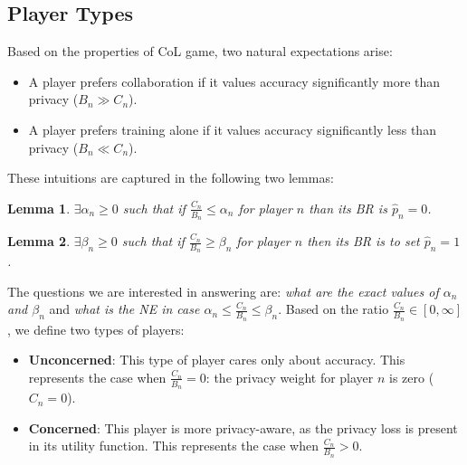 \documentclass[USenglish,oneside,twocolumn]{article}
\theoremstyle{plain}
\newtheorem{lemma}{Lemma}
\begin{document}
    \subsection{Player Types}
    \vspace{-0.25cm}
    
    Based on the properties of CoL game, two natural expectations arise:
    
    \begin{itemize}
        \item A player prefers collaboration if it values accuracy significantly more than privacy ($B_n\gg C_n$).
        \item A player prefers training alone if it values accuracy significantly less than privacy ($B_n\ll C_n$).
    \end{itemize}
    \vspace{-0.25cm}
    
    These intuitions are captured in the following two lemmas:
    
    \vspace{-0.25cm}
    \begin{lemma}
        \label{lemma:1}
        $\exists\alpha_n\geq0$ such that if $\frac{C_n}{B_n}\leq\alpha_n$ for player $n$ than its BR is $\hat{p}_n=0$.
    \end{lemma}
    \vspace{-0.75cm}
    \begin{lemma}
        \label{lemma:2}
        $\exists\beta_n\geq0$ such that if $\frac{C_n}{B_n}\geq\beta_n$ for player $n$ then its BR is to set $\hat{p}_n=1$.
    \end{lemma}
    \vspace{-0.25cm}
    
    The questions we are interested in answering are: \textit{what are the exact values of $\alpha_n$ and $\beta_n$} and \textit{what is the NE in case $\alpha_n\leq\frac{C_n}{B_n}\leq\beta_n$}. Based on the ratio $\frac{C_n}{B_n}\in[0,\infty]$, we define two types of players:
    
    \begin{itemize}
        \item \textbf{Unconcerned}: This type of player cares only about accuracy. This represents the case when $\frac{C_n}{B_n}=0$: the privacy weight for player $n$ is zero ($C_n=0$).
        \item \textbf{Concerned}: This player is more privacy-aware, as the privacy loss is present in its utility function. This represents the case when $\frac{C_n}{B_n}>0$.
    \end{itemize}
    \vspace{-0.25cm}
    
\end{document}
